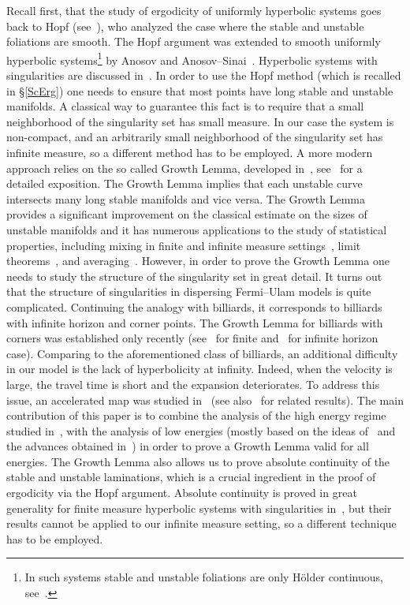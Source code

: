 \documentclass[AHL, Unicode, longabstracts,published]{cedram}
\begin{document}
Recall first, that the study of ergodicity of uniformly hyperbolic systems goes back to Hopf (see~\cite{Hopf}), who analyzed the case where the stable and unstable foliations are smooth. The Hopf argument was extended to smooth uniformly hyperbolic systems\footnote{In such systems stable and unstable foliations are only H\"older continuous, see~\cite{Anosov}.} by Anosov and Anosov--Sinai~\cite{Anosov, AS}. Hyperbolic systems with singularities are discussed in~\cite{SC, KatStr, LW,Pesin,Sinai}. In order to use the Hopf method (which is recalled in \S\ref{ScErg}) one needs to ensure that most points have long stable and unstable manifolds. A classical way to guarantee this fact is to require that a small neighborhood of the singularity set has small measure. In our case the system is non-compact, and an arbitrarily small neighborhood of the singularity set has infinite measure, so a different method has to be employed. A more modern approach relies on the so called Growth Lemma, developed in~\cite{BSC}, see~\cite{ChM} for a detailed exposition. The Growth Lemma implies that each unstable curve intersects many long stable manifolds and vice versa. The Growth Lemma provides a significant improvement on the classical estimate on the sizes of unstable manifolds and it has numerous applications to the study of statistical properties, including mixing in finite and infinite measure settings~\cite{C2, C3, ChZ, DN-Mech}, limit theorems~\cite{C4, DSV}, and averaging~\cite{CD1, CD2, DN-Tube}. However, in order to prove the Growth Lemma one needs to study the structure of the singularity set in great detail. It turns out that the structure of singularities in dispersing Fermi--Ulam models is quite complicated. Continuing the analogy with billiards, it corresponds to billiards with infinite horizon and corner points. The Growth Lemma for billiards with corners was established only recently (see~\cite{jmogy} for finite and~\cite{BrownNandori} for infinite horizon case). Comparing to the aforementioned class of billiards, an additional difficulty in our model is the lack of hyperbolicity at infinity. Indeed, when the velocity is large, the travel time is short and the expansion deteriorates. To address this issue, an accelerated map was studied in~\cite{fum} (see also~\cite{DF, D-icmp} for related results). The main contribution of this paper is to combine the analysis of the high energy regime studied in~\cite{fum}, with the analysis of low energies (mostly based on the ideas of~\cite{ChM} and the advances obtained in~\cite{jmogy}) in order to prove a Growth Lemma valid for all energies. The Growth Lemma also allows us to prove absolute continuity of the stable and unstable laminations, which is a crucial ingredient in the proof of ergodicity via the Hopf argument. Absolute continuity is proved in great generality for finite measure hyperbolic systems with singularities in~\cite{KatStr}, but their results cannot be applied to our infinite measure setting, so a different technique has to be employed.
\end{document}

